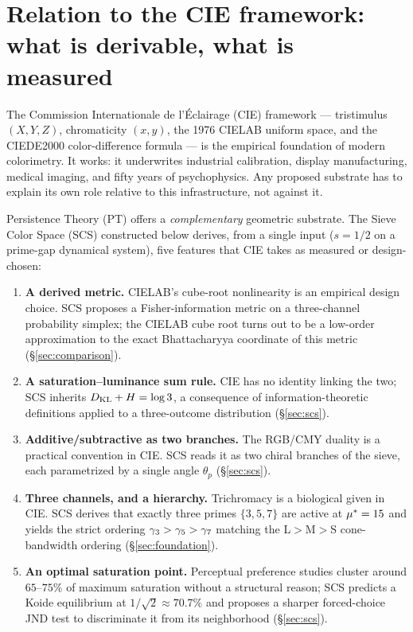 \documentclass[12pt,a4paper]{article}
\begin{document}
\tableofcontents
\newpage

\section{Relation to the CIE framework: what is derivable, what is measured}
\label{sec:intro}

The Commission Internationale de l'\'Eclairage (CIE) framework ---
tristimulus $(X, Y, Z)$, chromaticity $(x, y)$, the 1976 CIELAB uniform
space, and the CIEDE2000 color-difference formula --- is the empirical
foundation of modern colorimetry. It works: it underwrites industrial
calibration, display manufacturing, medical imaging, and fifty years of
psychophysics. Any proposed substrate has to explain its own role
relative to this infrastructure, not against it.

Persistence Theory (PT) offers a \emph{complementary} geometric
substrate. The Sieve Color Space (SCS) constructed below derives, from
a single input ($s = 1/2$ on a prime-gap dynamical system), five
features that CIE takes as measured or design-chosen:

\begin{enumerate}[nosep]
\item \textbf{A derived metric.} CIELAB's cube-root nonlinearity is an
  empirical design choice. SCS proposes a Fisher-information metric on
  a three-channel probability simplex; the CIELAB cube root turns out
  to be a low-order approximation to the exact Bhattacharyya coordinate
  of this metric (\S\ref{sec:comparison}).
\item \textbf{A saturation--luminance sum rule.} CIE has no identity
  linking the two; SCS inherits $D_{\mathrm{KL}} + H = \log 3$, a consequence of
  information-theoretic definitions applied to a three-outcome
  distribution (\S\ref{sec:scs}).
\item \textbf{Additive/subtractive as two branches.} The RGB/CMY duality
  is a practical convention in CIE. SCS reads it as two chiral branches
  of the sieve, each parametrized by a single angle $\theta_p$
  (\S\ref{sec:scs}).
\item \textbf{Three channels, and a hierarchy.} Trichromacy is a
  biological given in CIE. SCS derives that exactly three primes
  $\{3, 5, 7\}$ are active at ${\mu^{*}} = 15$ and yields the strict
  ordering $\gamma_{3} > \gamma_{5} > \gamma_{7}$ matching the L$>$M$>$S
  cone-bandwidth ordering (\S\ref{sec:foundation}).
\item \textbf{An optimal saturation point.} Perceptual preference
  studies cluster around $65$--$75\%$ of maximum saturation without a
  structural reason; SCS predicts a Koide equilibrium at
  $1/\sqrt{2} \approx 70.7\%$ and proposes a sharper forced-choice JND
  test to discriminate it from its neighborhood (\S\ref{sec:scs}).
\end{enumerate}
\end{document}
